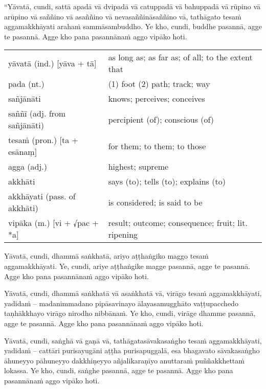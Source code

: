 \documentclass[11pt,oneside]{memoir}
\begin{document}
\begin{spacedquote}
“Yāvatā, cundi, sattā apadā vā dvipadā vā catuppadā vā bahuppadā vā rūpino vā arūpino vā saññino vā asaññino vā nevasaññināsaññino vā,
tathāgato tesaṁ aggamakkhāyati arahaṁ sammāsambuddho.
Ye kho, cundi, buddhe pasannā, agge te pasannā.
Agge kho pana pasannānaṁ aggo vipāko hoti.
\end{spacedquote}

\begin{longtable}{L{\colOne} L{\colTwo}}
yāvatā (ind.) [yāva + tā] & as long as; as far as; of all; to the extent that\\[0pt]
pada (nt.) & (1) foot (2) path; track; way\\[0pt]
sañjānāti & knows; perceives; conceives\\[0pt]
saññī (adj. from sañjānāti) & percipient (of); conscious (of)\\[0pt]
tesaṁ (pron.) [ta + esānaṃ] & for them; to them; to those\\[0pt]
agga (adj.) & highest; supreme\\[0pt]
akkhāti & says (to); tells (to); explains (to)\\[0pt]
akkhāyati (pass. of akkhāti) & is considered; is said to be\\[0pt]
vipāka (m.) [vi + √pac + *a] & result; outcome; consequence; fruit; lit. ripening\\[0pt]
\end{longtable}

\clearpage

\begin{spacedquote}
Yāvatā, cundi, dhammā saṅkhatā, ariyo aṭṭhaṅgiko maggo tesaṁ aggamakkhāyati.
Ye, cundi, ariye aṭṭhaṅgike magge pasannā, agge te pasannā.
Agge kho pana pasannānaṁ aggo vipāko hoti.

Yāvatā, cundi, dhammā saṅkhatā vā asaṅkhatā vā, virāgo tesaṁ aggamakkhāyati, yadidaṁ -- madanimmadano pipāsavinayo ālayasamugghāto vaṭṭupacchedo taṇhākkhayo virāgo nirodho nibbānaṁ.
Ye kho, cundi, virāge dhamme pasannā, agge te pasannā.
Agge kho pana pasannānaṁ aggo vipāko hoti.

Yāvatā, cundi, saṅghā vā gaṇā vā, tathāgatasāvakasaṅgho tesaṁ aggamakkhāyati, yadidaṁ -- cattāri purisayugāni aṭṭha purisapuggalā, esa bhagavato sāvakasaṅgho āhuneyyo pāhuneyyo dakkhiṇeyyo añjalikaraṇīyo anuttaraṁ puññakkhettaṁ lokassa.
Ye kho, cundi, saṅghe pasannā, agge te pasannā.
Agge kho pana pasannānaṁ aggo vipāko hoti.
\end{spacedquote}
\end{document}
